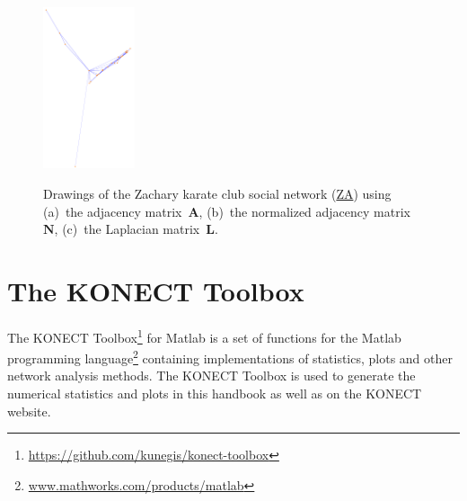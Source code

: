 \documentclass{article}
\newcommand{\wFour}{0.24\textwidth}
\begin{document}
\begin{figure}
{    \includegraphics[width=\wFour]{plot/map.ax.lap.ucidata-zachary}}
  \caption{ Drawings of the Zachary karate club social network
    (\href{http://konect.uni-koblenz.de/networks/ucidata-zachary}{\textsf{ZA}})
    using (a)~the adjacency matrix~$\mathbf A$, (b)~the normalized
    adjacency matrix~$\mathbf N$, (c)~the Laplacian matrix~$\mathbf L$.
    \label{fig:map.ax}
  }
\end{figure}

\section{The KONECT Toolbox}
\label{sec:toolbox}
The KONECT
Toolbox\footnote{\href{https://github.com/kunegis/konect-toolbox}{https://github.com/kunegis/konect-toolbox}}
for Matlab is a set of functions for the Matlab programming
language\footnote{\href{http://www.mathworks.com/products/matlab/}{www.mathworks.com/products/matlab}}
containing implementations of statistics, plots and other network
analysis methods.  The KONECT Toolbox is used to generate the numerical
statistics and plots in this handbook as well as on the KONECT website.
\end{document}
